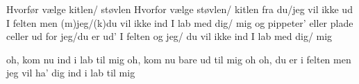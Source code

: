 \documentclass[a4paper,11pt]{article}
\begin{document}
\begin{song}
	 Hvorfør vælge kitlen/ støvlen
	Hvorfor vælge  støvlen/ kitlen fra
 	du/jeg vil ikke ud I felten men (m)jeg/(k)du
	vil ikke ind I lab med  dig/ mig
        og pippeter’
       	eller plade celler ud for jeg/du er
        ud’ I felten og  jeg/ du
	vil ikke ind I lab med  dig/ mig

	 oh, kom nu ind i lab til mig
	oh, kom nu bare ud til mig
	oh oh, du er i felten men jeg
	vil ha’ dig ind i lab til mig
\end{song}
\end{document}
